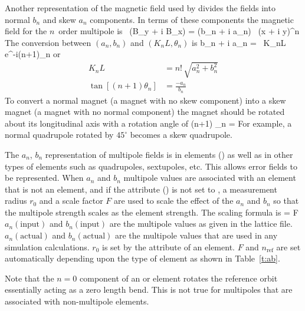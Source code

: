 Another representation of the magnetic field used by \bmad divides
the fields into normal $b_n$ and skew $a_n$ components. In terms of
these components the magnetic field for the $n$\Th\ order multipole is
\Begineq
   \, (B_y + i B_x) = (b_n + i a_n) \, (x + i y)^n
  \label{qlpbb}
\Endeq
The conversion between $(a_n, b_n)$ and $(K_nL, \theta_n)$ is
\Begineq
  b_n + i a_n =  \, K_nL \, e^{-i(n+1)\theta_n}
\Endeq
or
\begin{align}
  K_n L &= n! \, \sqrt{a_n^2 + b_n^2} \\
  \tan[(n+1) \theta_n] &= \frac{-a_n}{b_n}
\end{align}
To convert a normal magnet (a magnet with no skew component) into a skew
magnet (a magnet with no normal component) the magnet should be rotated
about its longitudinal axis with a rotation angle of
\Begineq
  (n+1) \theta_n = 
\Endeq
For example, a normal quadrupole rotated by $45^\circ$ becomes a
skew quadrupole.

The $a_n$, $b_n$ representation of multipole fields is in
 elements () as well as in other types
of elements such as quadrupoles, sextupoles, etc. This allows error
fields to be represented.  When $a_n$ and $b_n$ multipole values are
associated with an element that is not an  element,
and if the  attribute () is not
set to , a measurement radius $r_0$ and a scale factor $F$
are used to scale the effect of the $a_n$ and $b_n$ so that the
multipole strength scales as the element strength. The scaling formula
is
\Begineq
   =
  \cdot F \cdot {} 
  \label{ababf}
\Endeq
$a_n(\text{input})$ and $b_n(\text{input})$ are the multipole values as given in the
lattice file. $a_n(\text{actual})$ and $b_n(\text{actual})$ are the multipole values
that are used in any simulation calculations. $r_0$ is set by the
 attribute of an element. $F$ and $n_\text{ref}$ are set
automatically depending upon the type of element as shown in
Table~\ref{t:ab}.

Note that the $n = 0$ component of an  or 
element rotates the reference orbit essentially acting as a zero length bend.
This is not true for multipoles that are associated with 
non-multipole elements.

